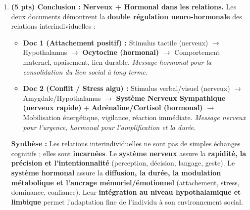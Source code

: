 \documentclass[11pt]{article}
\begin{document}
\begin{corrige}
\begin{enumerate}
\textbf{Interprétation :}
\begin{itemize}
\item \textbf{Silence seul (70 bpm) \& Conversation amicale (68 bpm) :} FC proche de la normale au repos. Dominance du \textbf{système nerveux parasympathique} (nerf vague) $\to$ libération d'acétylcholine sur nœud sinusal $\to$ freinage vagal (homéostasie, sécurité, lien social positif). La conversation amicale (lien positif) peut même augmenter légèrement le tonus vagal (effet apaisant ocytocine/ventral vagal).
\item \textbf{Dispute (105 bpm) :} Augmentation massive (+50\% vs repos). Activation aiguë du \textbf{système nerveux sympathique} (perception menace/colère $\to$ amygdale $\to$ hypothalamus) $\to$ noradrénaline cardiaque + \textbf{adrénaline} (médullosurrénale) $\to$ récepteurs $\beta_1$ $\to$ chronotropie et inotropie positives. Préparation combat/fuite. Le contexte interindividuel conflictuel bascule l'équilibre autonomique vers la sympathicotonie.
\end{itemize}
\item \textbf{(5 pts) Conclusion : Nerveux + Hormonal dans les relations.}
Les deux documents démontrent la \textbf{double régulation neuro-hormonale} des relations interindividuelles :
\begin{itemize}
\item \textbf{Doc 1 (Attachement positif) :} Stimulus tactile (nerveux) $\to$ Hypothalamus $\to$ \textbf{Ocytocine (hormonal)} $\to$ Comportement maternel, apaisement, lien durable. \textit{Message hormonal pour la consolidation du lien social à long terme.}
\item \textbf{Doc 2 (Conflit / Stress aigu) :} Stimulus verbal/visuel (nerveux) $\to$ Amygdale/Hypothalamus $\to$ \textbf{Système Nerveux Sympathique (nerveux rapide)} + \textbf{Adrénaline/Cortisol (hormonal)} $\to$ Mobilisation énergétique, vigilance, réaction immédiate. \textit{Message nerveux pour l'urgence, hormonal pour l'amplification et la durée.}
\end{itemize}
\textbf{Synthèse :} Les relations interindividuelles ne sont pas de simples échanges cognitifs ; elles sont \textbf{incarnées}. Le \textbf{système nerveux} assure la \textbf{rapidité, la précision et l'intentionnalité} (perception, décision, langage, geste). Le \textbf{système hormonal} assure la \textbf{diffusion, la durée, la modulation métabolique et l'ancrage mémoriel/émotionnel} (attachement, stress, dominance, confiance). Leur \textbf{intégration au niveau hypothalamique et limbique} permet l'adaptation fine de l'individu à son environnement social.

\end{enumerate}
\end{corrige}
\end{document}
